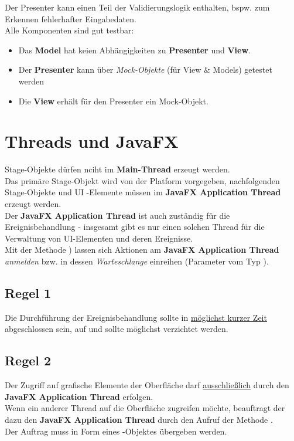 \noindent
Der Presenter kann einen Teil der Validierungslogik enthalten, bspw. zum Erkennen fehlerhafter Eingabedaten.\\

\noindent
Alle Komponenten sind gut testbar:

\begin{itemize}
    \item Das \textbf{Model} hat keien Abhängigkeiten zu \textbf{Presenter} und \textbf{View}.
    \item Der \textbf{Presenter} kann über \textit{Mock-Objekte} (für View & Models) getestet werden
    \item Die \textbf{View} erhält für den Presenter ein Mock-Objekt.
\end{itemize}

\section{Threads und JavaFX}

Stage-Objekte dürfen nciht im \textbf{Main-Thread} erzeugt werden. \\
Das primäre Stage-Objekt wird von der Platform vorgegeben, nachfolgenden Stage-Objekte und UI -Elemente müssen im \textbf{JavaFX Application Thread} erzeugt werden.\\

\noindent
Der \textbf{JavaFX Application Thread} ist auch zuständig für die Ereignisbehandlung - insgesamt gibt es nur einen solchen Thread für die Verwaltung von UI-Elementen und deren Ereignisse. \\

\noindent
Mit der Methode ) lassen sich Aktionen am \textbf{JavaFX Application Thread} \textit{anmelden} bzw. in dessen \textit{Warteschlange} einreihen (Parameter vom Typ ).\\

\subsection*{Regel 1}
Die Durchführung der Ereignisbehandlung sollte in \underline{möglichst kurzer Zeit} abgeschlossen sein, auf  und  sollte möglichst verzichtet werden.

\subsection*{Regel 2}
Der Zugriff auf grafische Elemente der Oberfläche darf \underline{ausschließlich} durch den \textbf{JavaFX Application Thread} erfolgen.\\
Wenn ein anderer Thread auf die Oberfläche zugreifen möchte, beauftragt der dazu den \textbf{JavaFX Application Thread} durch den Aufruf der Methode .\\
Der Auftrag muss in Form eines -Objektes übergeben werden.\\

